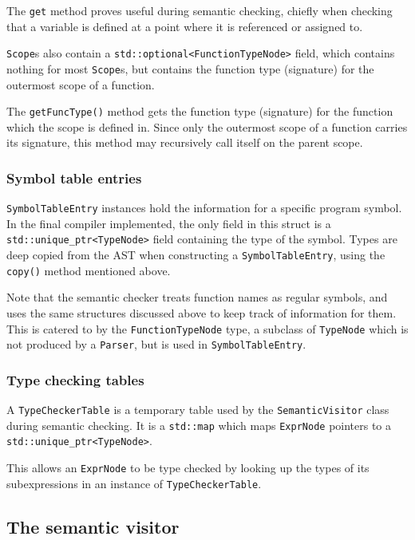 \documentclass[11pt,a4paper]{scrartcl}
\begin{document}
The \verb|get| method proves useful during semantic checking, chiefly when checking that a variable is defined at a point where it is referenced or assigned to.

\verb|Scope|s also contain a \verb|std::optional<FunctionTypeNode>| field, which contains nothing for most \verb|Scope|s, but contains the function type (signature) for the outermost scope of a function.

The \verb|getFuncType()| method gets the function type (signature) for the function which the scope is defined in. Since only the outermost scope of a function carries its signature, this method may recursively call itself on the parent scope.

\subsubsection{Symbol table entries}

\verb|SymbolTableEntry| instances hold the information for a specific program symbol. In the final compiler implemented, the only field in this struct is a \verb|std::unique_ptr<TypeNode>| field containing the type of the symbol. Types are deep copied from the AST when constructing a \verb|SymbolTableEntry|, using the \verb|copy()| method mentioned above.

Note that the semantic checker treats function names as regular symbols, and uses the same structures discussed above to keep track of information for them. This is catered to by the \verb|FunctionTypeNode| type, a subclass of \verb|TypeNode| which is not produced by a \verb|Parser|, but is used in \verb|SymbolTableEntry|.

\subsubsection{Type checking tables}

A \verb|TypeCheckerTable| is a temporary table used by the \verb|SemanticVisitor| class during semantic checking. It is a \verb|std::map| which maps \verb|ExprNode| pointers to a \verb|std::unique_ptr<TypeNode>|.

This allows an \verb|ExprNode| to be type checked by looking up the types of its subexpressions in an instance of \verb|TypeCheckerTable|.

\subsection{The semantic visitor}
\end{document}
